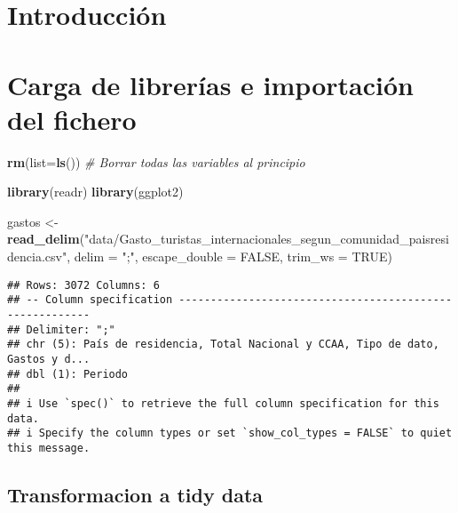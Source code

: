 \documentclass[notspecified,article,submit,moreauthors,pdftex]{Definitions/mdpi}
\newenvironment{Shaded}{\begin{snugshade}}{\end{snugshade}}
\newcommand{\AttributeTok}[1]{\textcolor[rgb]{0.13,0.29,0.53}{#1}}
\newcommand{\CommentTok}[1]{\textcolor[rgb]{0.56,0.35,0.01}{\textit{#1}}}
\newcommand{\ConstantTok}[1]{\textcolor[rgb]{0.56,0.35,0.01}{#1}}
\newcommand{\FunctionTok}[1]{\textcolor[rgb]{0.13,0.29,0.53}{\textbf{#1}}}
\newcommand{\NormalTok}[1]{#1}
\newcommand{\OtherTok}[1]{\textcolor[rgb]{0.56,0.35,0.01}{#1}}
\newcommand{\StringTok}[1]{\textcolor[rgb]{0.31,0.60,0.02}{#1}}
\begin{document}

\section{Introducción}\label{introducciuxf3n}

\section{Carga de librerías e importación del
fichero}\label{carga-de-libreruxedas-e-importaciuxf3n-del-fichero}

\begin{Shaded}
\begin{Highlighting}[]
\FunctionTok{rm}\NormalTok{(}\AttributeTok{list=}\FunctionTok{ls}\NormalTok{())  }\CommentTok{\# Borrar todas las variables al principio}
\end{Highlighting}
\end{Shaded}

\begin{Shaded}
\begin{Highlighting}[]
\FunctionTok{library}\NormalTok{(readr)}
\FunctionTok{library}\NormalTok{(ggplot2)}
\end{Highlighting}
\end{Shaded}

\begin{Shaded}
\begin{Highlighting}[]
\NormalTok{gastos }\OtherTok{\textless{}{-}} \FunctionTok{read\_delim}\NormalTok{(}\StringTok{"data/Gasto\_turistas\_internacionales\_segun\_comunidad\_paisresidencia.csv"}\NormalTok{,  }\AttributeTok{delim =} \StringTok{";"}\NormalTok{, }\AttributeTok{escape\_double =} \ConstantTok{FALSE}\NormalTok{, }\AttributeTok{trim\_ws =} \ConstantTok{TRUE}\NormalTok{)}
\end{Highlighting}
\end{Shaded}

\begin{verbatim}
## Rows: 3072 Columns: 6
## -- Column specification --------------------------------------------------------
## Delimiter: ";"
## chr (5): País de residencia, Total Nacional y CCAA, Tipo de dato, Gastos y d...
## dbl (1): Periodo
## 
## i Use `spec()` to retrieve the full column specification for this data.
## i Specify the column types or set `show_col_types = FALSE` to quiet this message.
\end{verbatim}

\subsection{Transformacion a tidy
data}\label{transformacion-a-tidy-data}
\end{document}
